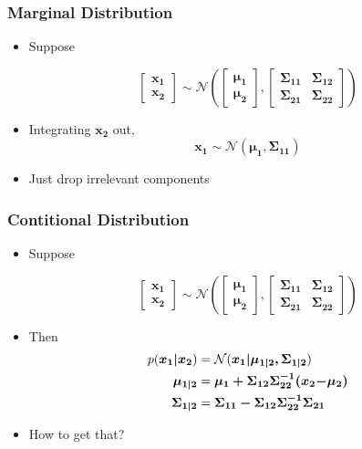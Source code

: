 \documentclass{beamer}
\begin{document}
\begin{frame}
	\frametitle{Marginal Distribution}
	\begin{itemize}
		\item Suppose

		\[\left[ {\begin{array}{*{20}{c}}
			{\bm{x_1}}\\
			{\bm{x_2}}
			\end{array}} \right] \sim \mathcal{N}\left( {\left[ {\begin{array}{*{20}{c}}
				{\bm{\mu _1}}\\
				{\bm{\mu _2}}
				\end{array}} \right],\left[ {\begin{array}{*{20}{c}}
				{\bm{\Sigma _{11}}}&{\bm{\Sigma _{12}}}\\
				{\bm{\Sigma _{21}}}&{\bm{\Sigma _{22}}}
				\end{array}} \right]} \right)\]

		\item Integrating $\bm{x_2}$ out, 
		\[
			\bm{x_1} \sim \mathcal{N}(\bm{\mu_1}, \bm{\Sigma_{11}})
		\]
		\item Just drop irrelevant components
	\end{itemize}
\end{frame}

\begin{frame}
	\frametitle{Contitional Distribution}
	\begin{itemize}
		\item Suppose
		
		\[\left[ {\begin{array}{*{20}{c}}
			{\bm{x_1}}\\
			{\bm{x_2}}
			\end{array}} \right] \sim \mathcal{N}\left( {\left[ {\begin{array}{*{20}{c}}
				{\bm{\mu _1}}\\
				{\bm{\mu _2}}
				\end{array}} \right],\left[ {\begin{array}{*{20}{c}}
				{\bm{\Sigma _{11}}}&{\bm{\Sigma _{12}}}\\
				{\bm{\Sigma _{21}}}&{\bm{\Sigma _{22}}}
				\end{array}} \right]} \right)\]
		\item Then
		\begin{align*}
			p(\bm{x_1|x_2}) &= \mathcal{N}(\bm{x_1|\mu_{1|2}, \Sigma_{1|2}}) \\
			\bm{\mu_{1|2}} & = \bm{\mu _1 + \Sigma _{12}\Sigma _{22}^{ - 1}({x_2}{\rm{ - }}{\mu _2})} \\
			\bm{\Sigma_{1|2}} & = \bm{\Sigma _{11} - \Sigma _{12}\Sigma _{22}^{ - 1}\Sigma _{21}}
		\end{align*}
		\item{How to get that?}
	\end{itemize}
\end{frame}
\end{document}
